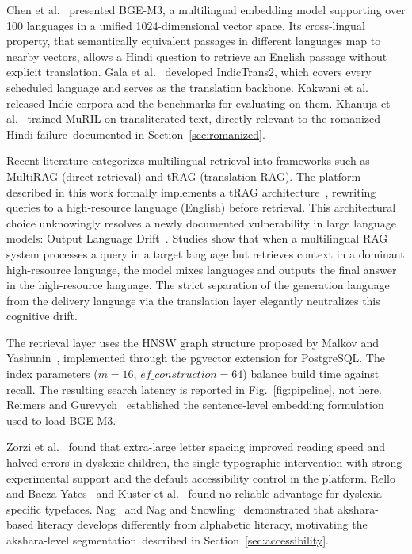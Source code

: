 Chen et al.~\cite{b6} presented BGE-M3, a multilingual embedding model supporting over 100 languages in a unified 1024-dimensional vector space. Its cross-lingual property, that semantically equivalent passages in different languages map to nearby vectors, allows a Hindi question to retrieve an English passage without explicit translation. Gala et al.~\cite{b7} developed IndicTrans2, which covers every scheduled language and serves as the translation backbone. Kakwani et al.~\cite{b1} released Indic corpora and the benchmarks for evaluating on them. Khanuja et al.~\cite{b8} trained MuRIL on transliterated text, directly relevant to the romanized Hindi failure\ifconf\else\ documented in Section~\ref{sec:romanized}\fi.

\ifshort\else  %
Recent literature categorizes multilingual retrieval into frameworks such as MultiRAG (direct retrieval) and tRAG (translation-RAG). The platform described in this work formally implements a tRAG architecture~\cite{b9}, rewriting queries to a high-resource language (English) before retrieval. This architectural choice unknowingly resolves a newly documented vulnerability in large language models: Output Language Drift~\cite{b10}. Studies show that when a multilingual RAG system processes a query in a target language but retrieves context in a dominant high-resource language, the model mixes languages and outputs the final answer in the high-resource language. The strict separation of the generation language from the delivery language via the translation layer elegantly neutralizes this cognitive drift.
\fi

The retrieval layer uses the HNSW graph structure proposed by Malkov and Yashunin~\cite{b11}, implemented through the pgvector extension for PostgreSQL. The index parameters ($m=16$, $ef\_construction=64$) balance build time against recall. The resulting search latency is reported in Fig.~\ref{fig:pipeline}, not here. Reimers and Gurevych~\cite{b12} established the sentence-level embedding formulation used to load BGE-M3.

\ifconf\else  %
Zorzi et al.~\cite{b13} found that extra-large letter spacing improved reading speed and halved errors in dyslexic children, the single typographic intervention with strong experimental support and the default accessibility control in the platform. Rello and Baeza-Yates~\cite{b14} and Kuster et al.~\cite{b15} found no reliable advantage for dyslexia-specific typefaces. Nag~\cite{b16} and Nag and Snowling~\cite{b17} demonstrated that akshara-based literacy develops differently from alphabetic literacy, motivating the akshara-level segmentation\ifconf\else\ described in Section~\ref{sec:accessibility}\fi.
\fi

